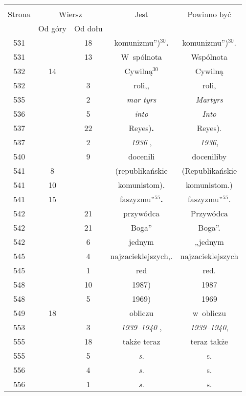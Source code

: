 \documentclass[a4paper,11pt]{article}
\begin{document}
\begin{center}
  \begin{tabular}{|c|c|c|c|c|}
    \hline
    & \multicolumn{2}{c|}{} & & \\
    Strona & \multicolumn{2}{c|}{Wiersz} & Jest
                              & Powinno być \\ \cline{2-3}
    & Od góry & Od dołu & & \\
    \hline
    531 & & 18 & komunizmu”)$^{ 30 }$\textbf{.} & komunizmu”)$^{ 30 }$. \\
    531 & & 13 & W~spólnota & Wspólnota \\
    532 & 14 & & Cywilną$^{ 30 }$ & Cywilną \\
    532 & &  3 & roli,,  %
           & roli, \\
    535 & &  2 & \textit{mar tyrs} & \textit{Martyrs} \\
    536 & &  5 & \textit{into} & \textit{Into} \\
    537 & & 22 & Reyes)\textbf{.} & Reyes). \\
    537 & &  2 & \textit{1936} , & \textit{1936}, \\
    540 & &  9 & docenili & doceniliby \\
    541 &  8 & & (republikańskie & (Republikańskie \\
    541 & 10 & & komunistom). & komunistom.) \\
    541 & 15 & & faszyzmu”$^{ 55 }$\textbf{.} & faszyzmu”$^{ 55 }$. \\
    542 & & 21 & przywódca & Przywódca \\
    542 & & 21 & Boga” & Boga”. \\
    542 & &  6 & jednym & „jednym \\
    545 & &  4 & najzacieklejszych,. & najzacieklejszych \\
    545 & &  1 & red & red. \\
    548 & & 10 & 1987) & 1987 \\
    548 & &  5 & 1969) & 1969 \\
    549 & 18 & & obliczu & w~obliczu \\
    553 & &  3 & \textit{1939--1940} , & \textit{1939--1940}, \\
    555 & & 18 & także teraz & teraz także \\
    555 & &  5 & \textit{s.} & s. \\
    556 & &  4 & \textit{s.} & s. \\
    556 & &  1 & \textit{s.} & s. \\

\end{tabular}
\end{center}
\end{document}
